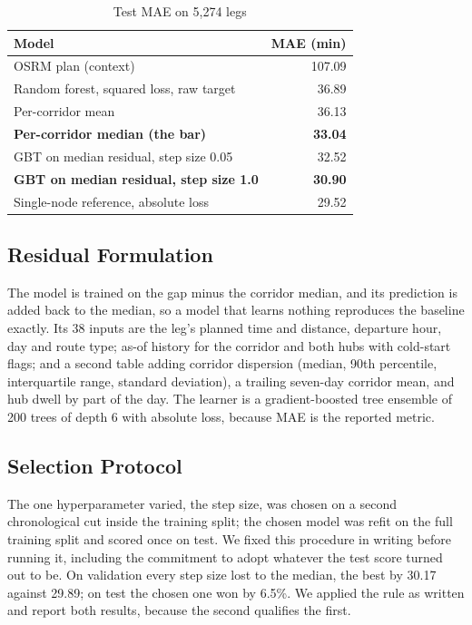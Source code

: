 \documentclass[conference]{IEEEtran}
\begin{document}
\begin{table}[t]
\caption{Test MAE on 5,274 legs}
\label{tab:mae}
\centering
\begin{tabular}{@{}lr@{}}
\toprule
Model & MAE (min) \\
\midrule
OSRM plan (context) & 107.09 \\
Random forest, squared loss, raw target & 36.89 \\
Per-corridor mean & 36.13 \\
\textbf{Per-corridor median (the bar)} & \textbf{33.04} \\
GBT on median residual, step size 0.05 & 32.52 \\
\textbf{GBT on median residual, step size 1.0} & \textbf{30.90} \\
Single-node reference, absolute loss & 29.52 \\
\bottomrule
\end{tabular}
\end{table}

\subsection{Residual Formulation}
The model is trained on the gap minus the corridor median, and its prediction is added back to the median, so a model that learns nothing reproduces the baseline exactly. Its 38 inputs are the leg's planned time and distance, departure hour, day and route type; as-of history for the corridor and both hubs with cold-start flags; and a second table adding corridor dispersion (median, 90th percentile, interquartile range, standard deviation), a trailing seven-day corridor mean, and hub dwell by part of the day. The learner is a gradient-boosted tree ensemble of 200 trees of depth 6 with absolute loss, because MAE is the reported metric.

\subsection{Selection Protocol}
The one hyperparameter varied, the step size, was chosen on a second chronological cut inside the training split; the chosen model was refit on the full training split and scored once on test. We fixed this procedure in writing before running it, including the commitment to adopt whatever the test score turned out to be. On validation every step size lost to the median, the best by 30.17 against 29.89; on test the chosen one won by 6.5\%. We applied the rule as written and report both results, because the second qualifies the first.
\end{document}

